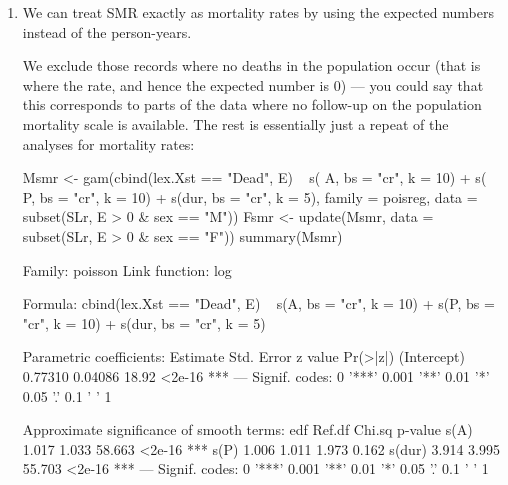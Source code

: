\begin{enumerate}[resume]




\item We can treat SMR exactly as mortality rates by using  the
  expected numbers instead of the person-years.

  We exclude those records where no deaths in the population occur
  (that is where the rate, and hence the expected number is 0) --- you
  could say that this corresponds to parts of the data where no
  follow-up on the population mortality scale is available. The rest
  is essentially just a repeat of the analyses for mortality rates:
\begin{Schunk}
\begin{Sinput}
 Msmr <- gam(cbind(lex.Xst == "Dead", E) ~ s(  A, bs = "cr", k = 10) +
                                           s(  P, bs = "cr", k = 10) +
                                           s(dur, bs = "cr", k = 5),
             family = poisreg,
               data = subset(SLr, E > 0 & sex == "M"))
 Fsmr <- update(Msmr, data = subset(SLr, E > 0 & sex == "F"))
 summary(Msmr)
\end{Sinput}
\begin{Soutput}
Family: poisson 
Link function: log 

Formula:
cbind(lex.Xst == "Dead", E) ~ s(A, bs = "cr", k = 10) + s(P, 
    bs = "cr", k = 10) + s(dur, bs = "cr", k = 5)

Parametric coefficients:
            Estimate Std. Error z value Pr(>|z|)    
(Intercept)  0.77310    0.04086   18.92   <2e-16 ***
---
Signif. codes:  0 '***' 0.001 '**' 0.01 '*' 0.05 '.' 0.1 ' ' 1

Approximate significance of smooth terms:
         edf Ref.df Chi.sq p-value    
s(A)   1.017  1.033 58.663  <2e-16 ***
s(P)   1.006  1.011  1.973   0.162    
s(dur) 3.914  3.995 55.703  <2e-16 ***
---
Signif. codes:  0 '***' 0.001 '**' 0.01 '*' 0.05 '.' 0.1 ' ' 1


\end{Soutput}
\end{Schunk}
\end{enumerate}
